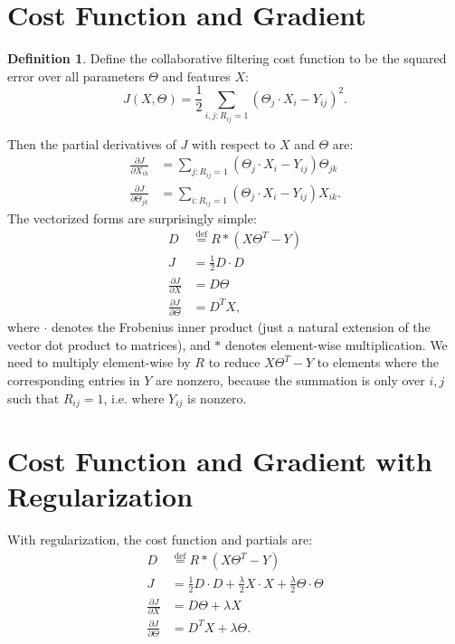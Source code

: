 \documentclass[12pt]{article}
\theoremstyle{plain}
\theoremstyle{definition}
\newtheorem{definition}[theorem]{Definition}
\theoremstyle{remark}
\newcommand{\defeq}{\overset{\mathrm{def}}{=}}
\begin{document}
\section{Cost Function and Gradient}

\begin{definition}
Define the collaborative filtering cost function to be the squared error over all parameters $\Theta$ and features $X$:
$$J(X, \Theta) = \frac{1}{2} \sum_{i,j:R_{ij}=1} (\Theta_j \cdot X_i - Y_{ij})^2.$$ 
\end{definition}

Then the partial derivatives of $J$ with respect to $X$ and $\Theta$ are: 
\begin{align*}
\frac{\partial J}{\partial X_{ik}} &= \sum_{j:R_{ij}=1} (\Theta_j \cdot X_i - Y_{ij}) \Theta_{jk} \\
\frac{\partial J}{\partial \Theta_{jk}} &= \sum_{i:R_{ij}=1} (\Theta_j \cdot X_i - Y_{ij}) X_{ik}.
\end{align*}
The vectorized forms are surprisingly simple:
\begin{align*}
D &\defeq R * (X \Theta^T - Y) \\
J &= \frac{1}{2}D \cdot D \\
\frac{\partial J}{\partial X} &= D \Theta \\
\frac{\partial J}{\partial \Theta} &= D^T X,
\end{align*}
where $\cdot$ denotes the Frobenius inner product (just a natural extension of the vector dot product to matrices), and $*$ denotes element-wise multiplication. We need to multiply element-wise by $R$ to reduce $X\Theta^T - Y$ to elements where the corresponding entries in $Y$ are nonzero, because the summation is only over $i,j$ such that $R_{ij} = 1$, i.e. where $Y_{ij}$ is nonzero.

\section{Cost Function and Gradient with Regularization}

With regularization, the cost function and partials are: 
\begin{align*}
D &\defeq R * (X \Theta^T - Y) \\
J &= \frac{1}{2}D \cdot D + \frac{\lambda}{2} X \cdot X + \frac{\lambda}{2} \Theta \cdot \Theta \\
\frac{\partial J}{\partial X} &= D \Theta + \lambda X \\
\frac{\partial J}{\partial \Theta} &= D^T X + \lambda \Theta.
\end{align*}
\end{document}
